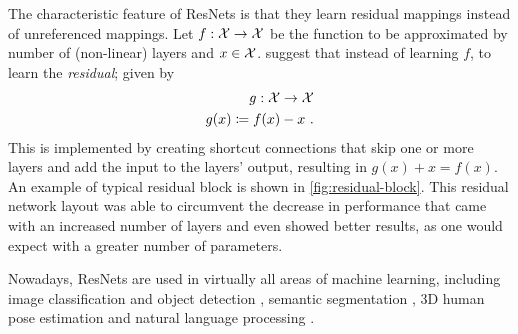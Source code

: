 The characteristic feature of ResNets is that they learn residual mappings instead of unreferenced mappings.
Let $f: \mathcal{X} \rightarrow \mathcal{X}$ be the function to be approximated by number of (non-linear) layers and $x \in \mathcal{X}$.
\citet{he16} suggest that instead of learning $f$, to learn the \emph{residual}; given by
\begin{equation}
	\begin{split}
		g: \mathcal{X} \rightarrow \mathcal{X} \\
		g(x) \coloneqq f(x) - x \ .
	\end{split}
\end{equation}
This is implemented by creating shortcut connections that skip one or more layers and add the input to the layers' output, resulting in $g(x) + x = f(x)$.
An example of typical residual block is shown in \cref{fig:residual-block}.
This residual network layout was able to circumvent the decrease in performance that came with an increased number of layers and even showed better results, as one would expect with a greater number of parameters.



Nowadays, ResNets are used in virtually all areas of machine learning, including image classification and object detection \cite{he16}, semantic segmentation \cite{chen17}, 3D human pose estimation \cite{drover18} and natural language processing \cite{keskar19,conneau16}.